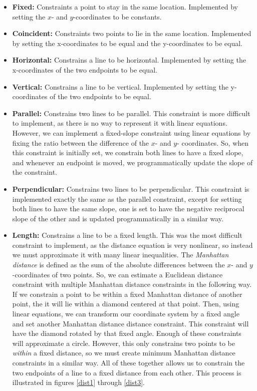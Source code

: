 \begin{itemize}
\item {\bf Fixed:} Constraints a point to stay in the same location. Implemented by setting the $x$- and $y$-coordinates to be constants.
\item {\bf Coincident:} Constraints two points to lie in the same location. Implemented by setting the x-coordinates to be equal and the y-coordinates to be equal.
\item {\bf Horizontal:} Constrains a line to be horizontal. Implemented by setting the x-coordinates of the two endpoints to be equal.
\item {\bf Vertical:} Constrains a line to be vertical. Implemented by setting the y-coordinates of the two endpoints to be equal.
\item {\bf Parallel:} Constrains two lines to be parallel. This constraint is more difficult to implement, as there is no way to represent it with linear equations. However, we can implement a fixed-slope constraint using linear equations by fixing the ratio between the difference of the $x$- and $y$- coordinates. So, when this constraint is initially set, we constrain both lines to have a fixed slope, and whenever an endpoint is moved, we programmatically update the slope of the constraint.
\item {\bf Perpendicular:} Constrains two lines to be perpendicular. This constraint is implemented exactly the same as the parallel constraint, except for setting both lines to have the same slope, one is set to have the negative reciprocal slope of the other and is updated programmatically in a similar way.
\item {\bf Length:} Constrains a line to be a fixed length. This was the most difficult constraint to implement, as the distance equation is very nonlinear, so instead we must approximate it with many linear inequalities. The {\it Manhattan distance} is defined as the sum of the absolute differences between the $x$- and $y$-coordinates of two points. So, we can estimate a Euclidean distance constraint with multiple Manhattan distance constraints in the following way. If we constrain a point to be within a fixed Manhattan distance of another point, the it will lie within a diamond centered at that point. Then, using linear equations, we can transform our coordinate system by a fixed angle and set another Manhattan distance distance constraint. This constraint will have the diamond rotated by that fixed angle. Enough of these constraints will approximate a circle. However, this only constrains two points to be {\it within} a fixed distance, so we must create minimum Manhattan distance constraints in a similar way. All of these together allows us to constrain the two endpoints of a line to a fixed distance from each other. This process is illustrated in figures \ref{dist1} through \ref{dist3}.
\end{itemize}

